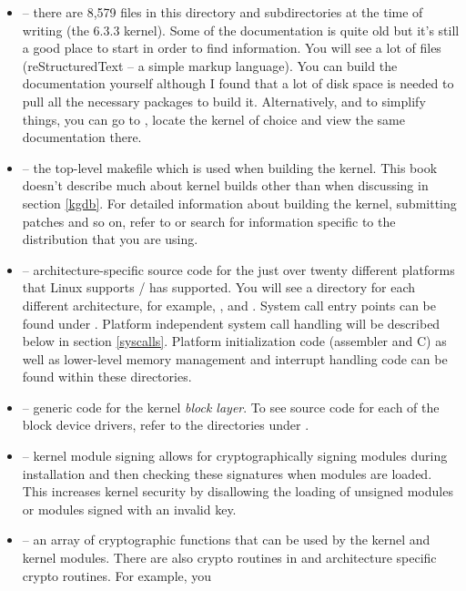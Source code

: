
\begin{itemize}
	\item {} -- there are 8,579 files in this directory and subdirectories at the time of writing
		(the 6.3.3 kernel).
		Some of the documentation is quite old but it's still a good place to start in order to find information. You will see
		a lot of  files (reStructuredText -- a simple markup language). You can build the documentation yourself 
		although I found that a lot of disk space is needed to pull all the necessary packages to build it. Alternatively, and 
		to simplify things, you can go to , locate the kernel of choice and view the 
		same documentation there.
	\item {} -- the top-level makefile which is used when building the kernel. This book doesn't describe
		much about kernel builds other than when discussing  in section \ref{kgdb}. For detailed
		information about building the kernel, submitting patches and so on, refer to  
		or search for information specific to the distribution that you are using.
	\item {} -- architecture-specific source code for the just over twenty different platforms that Linux supports /
		has supported. You will see a directory for each different architecture, for example, , 
		and . System call entry points can be found under . Platform independent 
		system call handling will be described below in section \ref{syscalls}. Platform initialization code (assembler and C) 
		as well as lower-level memory management and interrupt handling code can be found within these directories.
	\item {} -- generic code for the kernel \textit{block layer}. To see source code for each of the block device 
		drivers, refer to the directories under .
	\item {} -- kernel module signing allows for cryptographically signing modules during installation 
		and then checking these signatures when modules are loaded. This increases kernel security 
		by disallowing the loading of unsigned modules or modules signed with an invalid key.
	\item {} -- an array of cryptographic functions that can be used by the kernel and kernel modules. There are also
		crypto routines in  and architecture specific crypto routines. For example, you

\end{itemize}
